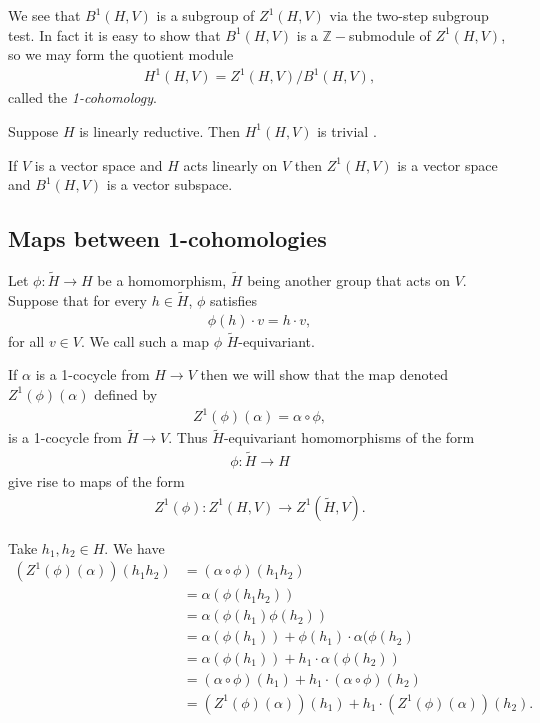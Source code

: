 We see that $B^1(H, V)$ is a subgroup of $Z^1(H, V)$ via the two-step subgroup test. In fact it is easy to show that $B^1(H, V)$ is a $\mathbb{Z}-$submodule of $Z^1(H, V)$, so we may form the quotient module
\begin{align*}
	H^1\left(H, V\right) = Z^1\left(H, V\right) / B^1\left(H, V\right),
\end{align*}
called the \emph{1-cohomology}.
\begin{lemma} Suppose $H$ is linearly reductive. Then $H^1(H, V)$ is trivial \cite[Proposition 1]{kemper2000characterization}.
  \label{lem:lin_red_h}
\end{lemma}

\begin{example}
  If $V$ is a vector space and $H$ acts linearly on $V$ then $Z^1(H, V)$ is a vector space and $B^1(H, V)$ is a vector subspace.
\end{example}

\subsection{Maps between 1-cohomologies}
Let $\phi:\tilde{H}\rightarrow H$ be a homomorphism, $\tilde{H}$ being another group that acts on $V$. Suppose that for every $h \in \tilde{H}$, $\phi$ satisfies
\begin{align*}
	\phi(h)\cdot v = h\cdot v,
\end{align*}
for all $v \in V$. We call such a map $\phi$ $\tilde{H}$-equivariant. 

If $\alpha$ is a 1-cocycle from $H\rightarrow V$ then we will show that the map denoted $Z^1(\phi)(\alpha)$ defined by
\begin{align*}
	Z^1(\phi)(\alpha) = \alpha \circ \phi,
\end{align*}
is a 1-cocycle from $\tilde{H}\rightarrow V$. Thus $\tilde{H}$-equivariant homomorphisms of the form
\begin{align*}
	\phi:\tilde{H} \rightarrow H
\end{align*}
give rise to maps of the form
\begin{align*}
	Z^1(\phi):Z^1(H, V)\rightarrow Z^1(\tilde{H}, V).
\end{align*}

Take $h_1, h_2 \in H$. We have
\begin{align*}
	\left( Z^1(\phi)(\alpha) \right) (h_1h_2) &=  (\alpha \circ \phi)(h_1h_2) \\
		&=  \alpha(\phi(h_1h_2)) \\
		&=  \alpha(\phi(h_1)\phi(h_2)) \\
		&=  \alpha(\phi(h_1)) + \phi(h_1)\cdot\alpha(\phi(h_2) \\
		&=  \alpha(\phi(h_1)) + h_1\cdot\alpha(\phi(h_2)) \\
		&=  (\alpha \circ \phi)(h_1) + h_1 \cdot (\alpha \circ \phi)(h_2) \\
		&=  \left( Z^1(\phi)(\alpha) \right) (h_1) + h_1\cdot \left( Z^1(\phi)(\alpha) \right)(h_2).
\end{align*}

